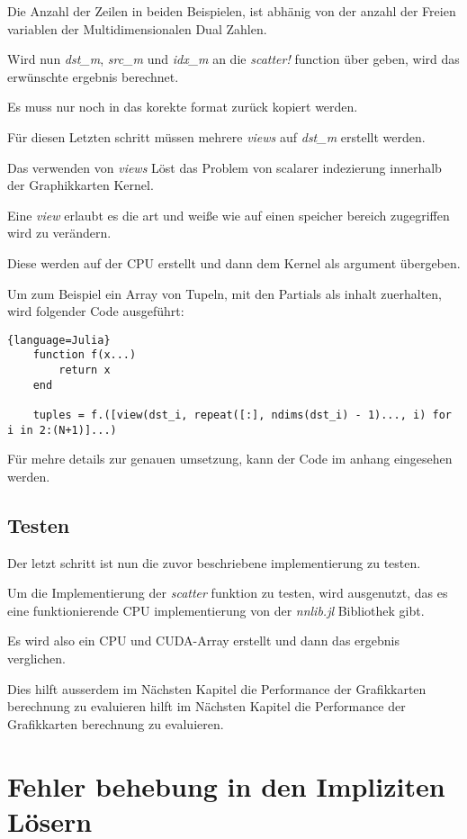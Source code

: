 Die Anzahl der Zeilen in beiden Beispielen, ist abhänig von der anzahl der Freien variablen  
der Multidimensionalen Dual Zahlen.

Wird nun \textit{dst_m}, \textit{src_m} und \textit{idx_m} an die \textit{scatter!} function über
geben, wird das erwünschte ergebnis berechnet. 

Es muss nur noch in das korekte format zurück kopiert werden. 

Für diesen Letzten schritt müssen mehrere \textit{views} auf
\textit{dst_m} erstellt werden.

Das verwenden von \textit{views} Löst das Problem von scalarer indezierung innerhalb der Graphikkarten Kernel. 

Eine \textit{view} erlaubt es die art und weiße wie auf einen speicher bereich zugegriffen wird zu verändern.

Diese werden auf der CPU erstellt und dann dem Kernel als argument übergeben.

Um zum Beispiel ein Array von Tupeln, mit den Partials als inhalt zuerhalten, wird folgender Code ausgeführt:

\begin{lstlisting}{language=Julia}
	function f(x...)
		return x
	end
	
	tuples = f.([view(dst_i, repeat([:], ndims(dst_i) - 1)..., i) for i in 2:(N+1)]...)
\end{lstlisting}


Für mehre details zur genauen umsetzung, kann der Code im anhang eingesehen werden.


\subsection{Testen}

Der letzt schritt ist nun die zuvor beschriebene implementierung zu testen.

Um die Implementierung der \textit{scatter} funktion zu testen, wird ausgenutzt,
das es eine funktionierende CPU implementierung von der \textit{nnlib.jl} Bibliothek gibt.

Es wird also ein CPU und CUDA-Array erstellt und dann das ergebnis verglichen.

Dies hilft ausserdem im Nächsten Kapitel die Performance der Grafikkarten berechnung zu evaluieren hilft im Nächsten Kapitel die Performance der Grafikkarten berechnung zu evaluieren.

\section{ Fehler behebung in den Impliziten Lösern }

